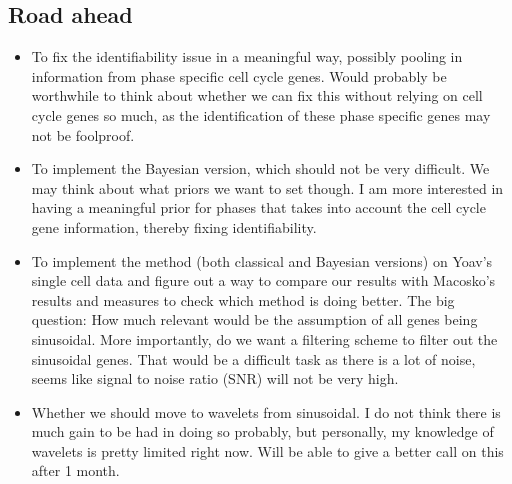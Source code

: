 \documentclass[11pt]{article}
\begin{document}
\subsection{Road ahead}

\begin{itemize}

\item To fix the identifiability issue in a meaningful way, possibly pooling in information from phase specific cell cycle genes. Would probably be worthwhile to think about  whether we can fix this without relying on cell cycle genes so much, as the identification of these phase specific genes may not be foolproof.

\item To implement the Bayesian version, which should not be very difficult. We may think about what priors we want to set though. I am more interested in having a meaningful prior for phases that takes into account the cell cycle gene information, thereby fixing identifiability. 

\item  To implement the method (both classical and Bayesian versions) on Yoav's single cell data and figure out a way to compare our results with Macosko's results and measures to check which method is doing better. The big question: How much relevant would be the assumption of all genes being sinusoidal. More importantly, do we want a filtering scheme to filter out the sinusoidal genes. That would be a difficult task as there is a lot of noise, seems like signal to noise ratio (SNR)  will not be very high.

\item Whether we should move to wavelets from sinusoidal. I do not think there is much gain to be had in doing so probably, but personally, my knowledge of wavelets is pretty limited right now. Will be able to give a better call on this after 1 month. 

\end{itemize}
\end{document}
